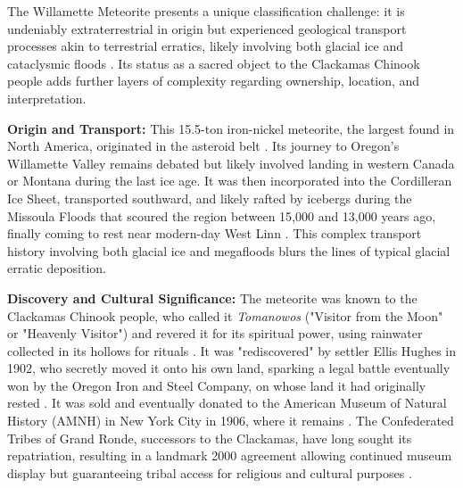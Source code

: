 \documentclass[
11pt, %
english, %
singlespacing, %
headsepline, %
]{MastersDoctoralThesis} %
\begin{document}
The Willamette Meteorite presents a unique classification challenge: it is undeniably extraterrestrial in origin but experienced geological transport processes akin to terrestrial erratics, likely involving both glacial ice and cataclysmic floods \cite{AMNHWillamette, Pasek2008}. Its status as a sacred object to the Clackamas Chinook people adds further layers of complexity regarding ownership, location, and interpretation.

\textbf{Origin and Transport:} This 15.5-ton iron-nickel meteorite, the largest found in North America, originated in the asteroid belt \cite{AMNHWillamette}. Its journey to Oregon's Willamette Valley remains debated but likely involved landing in western Canada or Montana during the last ice age. It was then incorporated into the Cordilleran Ice Sheet, transported southward, and likely rafted by icebergs during the Missoula Floods that scoured the region between 15,000 and 13,000 years ago, finally coming to rest near modern-day West Linn \cite{Pasek2008, Bretz1969}. This complex transport history involving both glacial ice and megafloods blurs the lines of typical glacial erratic deposition.

\textbf{Discovery and Cultural Significance:} The meteorite was known to the Clackamas Chinook people, who called it \emph{Tomanowos} ("Visitor from the Moon" or "Heavenly Visitor") and revered it for its spiritual power, using rainwater collected in its hollows for rituals \cite{statesmanjournalPiecesSacred, ourtimebdTomanowosMeteorite}. It was "rediscovered" by settler Ellis Hughes in 1902, who secretly moved it onto his own land, sparking a legal battle eventually won by the Oregon Iron and Steel Company, on whose land it had originally rested \cite{AMNHWillamette}. It was sold and eventually donated to the American Museum of Natural History (AMNH) in New York City in 1906, where it remains \cite{AMNHWillamette}. The Confederated Tribes of Grand Ronde, successors to the Clackamas, have long sought its repatriation, resulting in a landmark 2000 agreement allowing continued museum display but guaranteeing tribal access for religious and cultural purposes \cite{statesmanjournalPiecesSacred, ourtimebdTomanowosMeteorite}.
\end{document}
